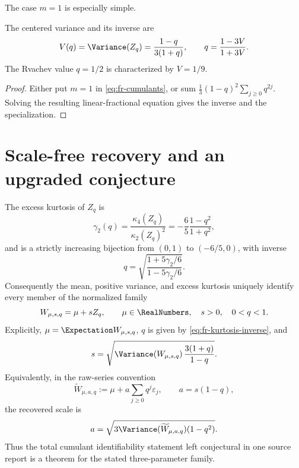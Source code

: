 The case \(m=1\) is especially simple.

\begin{corollary}
\label{cor:fr-variance-inverse}
The centered variance and its inverse are
\begin{equation}
 V(q)=\Variance(Z_q)=\frac{1-q}{3(1+q)},
 \qquad q=\frac{1-3V}{1+3V}.
 \label{eq:fr-variance-inverse}
\end{equation}
The Rvachev value \(q=1/2\) is characterized by \(V=1/9\).
\end{corollary}

\begin{proof}
Either put \(m=1\) in \cref{eq:fr-cumulants}, or sum
\(\frac13(1-q)^2\sum_{j\ge0}q^{2j}\).  Solving the resulting
linear-fractional equation gives the inverse and the specialization.
\end{proof}

\section{Scale-free recovery and an upgraded conjecture}
\label{sec:fr-scale-free}

\begin{theorem}
\label{thm:fr-total-identifiability}
The excess kurtosis of \(Z_q\) is
\begin{equation}
 \gamma_2(q)=\frac{\kappa_4(Z_q)}{\kappa_2(Z_q)^2}
 =-\frac65\frac{1-q^2}{1+q^2},
 \label{eq:fr-kurtosis}
\end{equation}
and is a strictly increasing bijection from \((0,1)\) to \((-6/5,0)\), with
inverse
\begin{equation}
 q=\sqrt{\frac{1+5\gamma_2/6}{1-5\gamma_2/6}}.
 \label{eq:fr-kurtosis-inverse}
\end{equation}
Consequently the mean, positive variance, and excess kurtosis uniquely
identify every member of the normalized family
\[
 W_{\mu,s,q}=\mu+sZ_q,
 \qquad \mu\in\RealNumbers,\quad s>0,\quad0<q<1.
\]
Explicitly, \(\mu=\Expectation W_{\mu,s,q}\), \(q\) is given by
\cref{eq:fr-kurtosis-inverse}, and
\begin{equation}
 s=\sqrt{\Variance(W_{\mu,s,q})\,\frac{3(1+q)}{1-q}}.
 \label{eq:fr-scale-inverse}
\end{equation}
Equivalently, in the raw-series convention
\begin{equation}\label{eq:fr-raw-scale-family}
 \widetilde W_{\mu,a,q}
 :=\mu+a\sum_{j\ge0}q^j\varepsilon_j,
 \qquad a=s(1-q),
\end{equation}
the recovered scale is
\begin{equation}\label{eq:fr-raw-scale-inverse}
 a=\sqrt{3\Variance(\widetilde W_{\mu,a,q})(1-q^2)}.
\end{equation}
Thus the total cumulant identifiability statement left conjectural in one
source report is a theorem for the stated three-parameter family.
\end{theorem}

